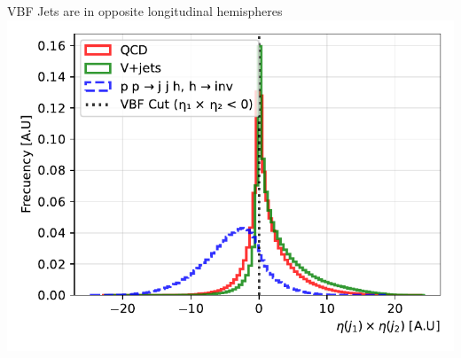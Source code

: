 \documentclass{../../bredelebeamer}
\begin{document}
\begin{frame}{VBF Jets are in opposite longitudinal hemispheres}
    \includegraphics[width=\textwidth]{../Images/eta_product_comparison.pdf}
\end{frame}
\end{document}
